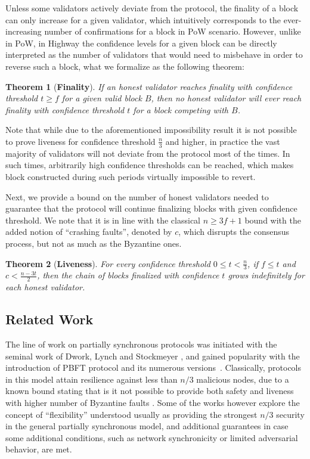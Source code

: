 \documentclass[12pt, fleqn]{article}
\newtheorem{theorem}{Theorem}
\begin{document}
Unless some validators actively deviate from the protocol, the finality of a block can only increase for a given validator, which intuitively corresponds to the ever-increasing number of confirmations for a block in PoW scenario.
However, unlike in PoW, in Highway the confidence levels for a given block can be directly interpreted as the number of validators that would need to misbehave in order to reverse such a block, what we formalize as the following theorem:

\begin{theorem}[\bf Finality]\label{thm:finality}
If an honest validator reaches finality with confidence threshold $t\geq f$ for a given valid block $B$, then no honest validator will ever reach finality with confidence threshold $t$ for a block competing with $B$.
\end{theorem}

Note that while due to the aforementioned impossibility result \cite{DLS88} it is not possible to prove liveness for confidence threshold $\frac{n}{3}$ and higher, in practice the vast majority of validators will not deviate from the protocol most of the times.
In such times, arbitrarily high confidence thresholds can be reached, which makes block constructed during such periods virtually impossible to revert.

Next, we provide a bound on the number of honest validators needed to guarantee that the protocol will continue finalizing blocks with given confidence threshold.
We note that it is in line with the classical $n\geq 3f+1$ bound with the added notion of ``crashing faults'', denoted by $c$, which disrupts the consensus process, but not as much as the Byzantine ones. 

\begin{theorem}[\bf Liveness]\label{thm:liveness}
For every confidence threshold $0 \leq t < \frac{n}{3}$, if $f\leq t$ and $c< \frac{n-3t}{2}$, then the chain of blocks finalized with confidence $t$ grows indefinitely for each honest validator.
\end{theorem}


\subsection{Related Work}

The line of work on partially synchronous protocols was initiated with the seminal work of Dwork, Lynch and Stockmeyer \cite{DLS88}, and gained popularity with the introduction of PBFT\cite{CL99} protocol and its numerous versions~\cite{BKM18,KADCW09,MNR19}. 
Classically, protocols in this model attain resilience against less than $n/3$ malicious nodes, due to a known bound stating that is it not possible to provide both safety and liveness with higher number of Byzantine faults \cite{DLS88}.
Some of the works however explore the concept of ``flexibility'' understood usually as providing the strongest $n/3$ security in the general partially synchronous model, and additional guarantees in case some additional conditions, such as network synchronicity or limited adversarial behavior, are met.
\end{document}
